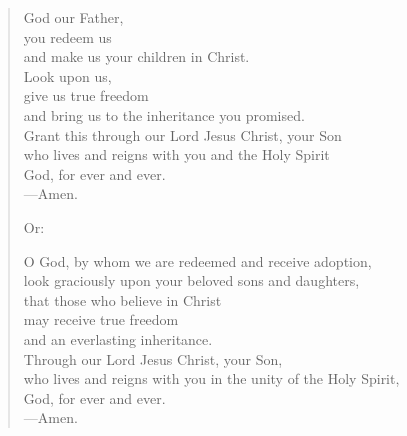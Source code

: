 \prayer

\setlength{\vleftmargin}{\prayerleftmargini}

\begin{verse}
God our Father,\\
you redeem us\\
and make us your children in Christ.\\
Look upon us,\\
give us true freedom\\
and bring us to the inheritance you promised.\\
Grant this through our Lord Jesus Christ, your Son\\
who lives and reigns with you and the Holy Spirit\\
God, for ever and ever.\\
{\color{red}---\thinspace}Amen.

{\color{red}Or:}

O God, by whom we are redeemed and receive adoption,\\
look graciously upon your beloved sons and daughters,\\
that those who believe in Christ\\
may receive true freedom\\
and an everlasting inheritance.\\
Through our Lord Jesus Christ, your Son,\\
who lives and reigns with you in the unity of the Holy Spirit,\\
God, for ever and ever.\\
{\color{red}---\thinspace}Amen.
\end{verse}

\setlength{\vleftmargin}{\defleftmargini}
